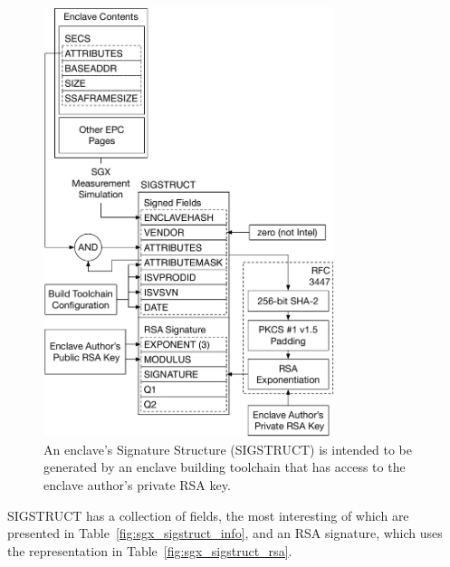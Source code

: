 \begin{figure}[hbt]
  \centering
  \includegraphics[width=85mm]{figures/sgx_sigstruct.pdf}
  \caption{
    An enclave's Signature Structure (SIGSTRUCT) is intended to be generated by
    an enclave building toolchain that has access to the enclave author's
    private RSA key.
  }
  \label{fig:sgx_sigstruct}
\end{figure}

SIGSTRUCT has a collection of fields, the most interesting of which are
presented in Table~\ref{fig:sgx_sigstruct_info}, and an RSA signature, which
uses the representation in Table~\ref{fig:sgx_sigstruct_rsa}.


